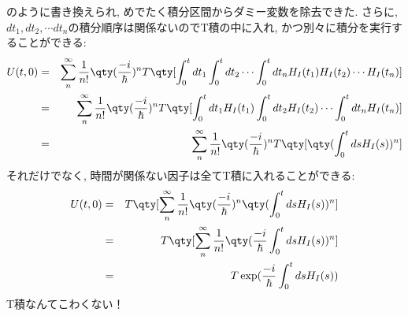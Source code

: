 のように書き換えられ, めでたく積分区間からダミー変数を除去できた. さらに, $dt_1, dt_2, \cdots dt_n$の積分順序は関係ないのでT積の中に入れ, かつ別々に積分を実行することができる:
\begin{eqnarray}
  U(t, 0) &=& \sum_{n}^\infty\frac{1}{n!}\qty(\frac{-i}{\hbar})^nT\qty[\int_0^t dt_1 \int_0^{t} dt_2\cdots\int_0^{t} dt_nH_I(t_1)H_I(t_2)\cdots H_I(t_n)]\\
  &=& \sum_{n}^\infty\frac{1}{n!}\qty(\frac{-i}{\hbar})^nT\qty[\int_0^t dt_1H_I(t_1) \int_0^{t} dt_2H_I(t_2)\cdots\int_0^{t} dt_nH_I(t_n)]\\
  &=& \sum_{n}^\infty\frac{1}{n!}\qty(\frac{-i}{\hbar})^nT\qty[\qty(\int_0^t ds H_I(s))^n]
\end{eqnarray}
それだけでなく, 時間が関係ない因子は全てT積に入れることができる:
\begin{eqnarray}
  U(t, 0) &=& T\qty[\sum_{n}^\infty\frac{1}{n!}\qty(\frac{-i}{\hbar})^n\qty(\int_0^t ds H_I(s))^n]\\
  &=& T\qty[\sum_{n}^\infty\frac{1}{n!}\qty(\frac{-i}{\hbar}\int_0^t ds H_I(s))^n]\\
  &=& T\exp(\frac{-i}{\hbar}\int_0^t ds H_I(s))
\end{eqnarray}
T積なんてこわくない！

